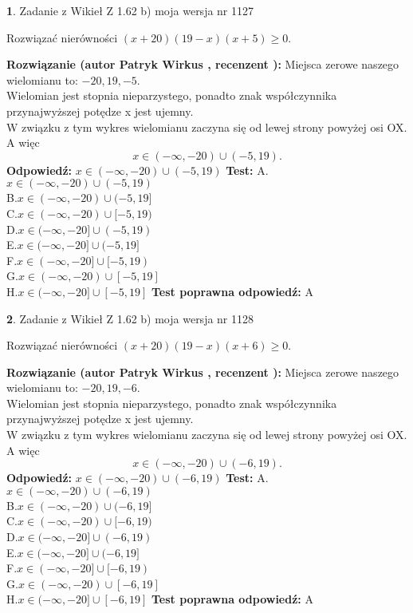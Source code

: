 \documentclass[12pt, a4paper]{article}
\theoremstyle{definition} %
\newtheorem{zad}{}
\newcommand{\zadStart}[1]{\begin{zad}#1\newline}
\newcommand{\zadStop}{\end{zad}}
\newcommand{\rozwStart}[2]{\noindent \textbf{Rozwiązanie (autor #1 , recenzent #2): }\newline}
\newcommand{\rozwStop}{\newline}
\newcommand{\odpStart}{\noindent \textbf{Odpowiedź:}\newline}
\newcommand{\odpStop}{\newline}
\newcommand{\testStart}{\noindent \textbf{Test:}\newline}
\newcommand{\testStop}{\newline}
\newcommand{\kluczStart}{\noindent \textbf{Test poprawna odpowiedź:}\newline}
\newcommand{\kluczStop}{\newline}
\begin{document}
\zadStart{Zadanie z Wikieł Z 1.62 b) moja wersja nr 1127}

Rozwiązać nierówności $(x+20)(19-x)(x+5)\ge0$.
\zadStop
\rozwStart{Patryk Wirkus}{}
Miejsca zerowe naszego wielomianu to: $-20, 19, -5$.\\
Wielomian jest stopnia nieparzystego, ponadto znak współczynnika przy\linebreak najwyższej potędze x jest ujemny.\\ W związku z tym wykres wielomianu zaczyna się od lewej strony powyżej osi OX. A więc $$x \in (-\infty,-20) \cup (-5,19).$$
\rozwStop
\odpStart
$x \in (-\infty,-20) \cup (-5,19)$
\odpStop
\testStart
A.$x \in (-\infty,-20) \cup (-5,19)$\\
B.$x \in (-\infty,-20) \cup (-5,19]$\\
C.$x \in (-\infty,-20) \cup [-5,19)$\\
D.$x \in (-\infty,-20] \cup (-5,19)$\\
E.$x \in (-\infty,-20] \cup (-5,19]$\\
F.$x \in (-\infty,-20] \cup [-5,19)$\\
G.$x \in (-\infty,-20) \cup [-5,19]$\\
H.$x \in (-\infty,-20] \cup [-5,19]$
\testStop
\kluczStart
A
\kluczStop



\zadStart{Zadanie z Wikieł Z 1.62 b) moja wersja nr 1128}

Rozwiązać nierówności $(x+20)(19-x)(x+6)\ge0$.
\zadStop
\rozwStart{Patryk Wirkus}{}
Miejsca zerowe naszego wielomianu to: $-20, 19, -6$.\\
Wielomian jest stopnia nieparzystego, ponadto znak współczynnika przy\linebreak najwyższej potędze x jest ujemny.\\ W związku z tym wykres wielomianu zaczyna się od lewej strony powyżej osi OX. A więc $$x \in (-\infty,-20) \cup (-6,19).$$
\rozwStop
\odpStart
$x \in (-\infty,-20) \cup (-6,19)$
\odpStop
\testStart
A.$x \in (-\infty,-20) \cup (-6,19)$\\
B.$x \in (-\infty,-20) \cup (-6,19]$\\
C.$x \in (-\infty,-20) \cup [-6,19)$\\
D.$x \in (-\infty,-20] \cup (-6,19)$\\
E.$x \in (-\infty,-20] \cup (-6,19]$\\
F.$x \in (-\infty,-20] \cup [-6,19)$\\
G.$x \in (-\infty,-20) \cup [-6,19]$\\
H.$x \in (-\infty,-20] \cup [-6,19]$
\testStop
\kluczStart
A
\kluczStop
\end{document}
